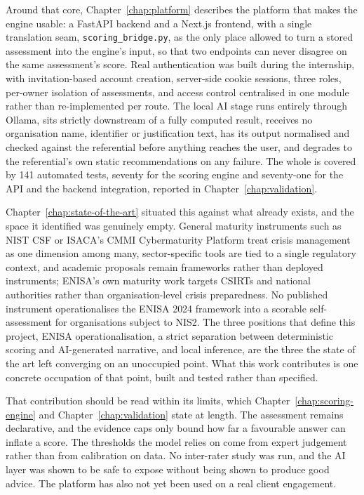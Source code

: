 Around that core, Chapter~\ref{chap:platform} describes the platform that makes
the engine usable: a FastAPI backend and a Next.js frontend, with a single
translation seam, \texttt{scoring\_\allowbreak bridge.\allowbreak py}, as the
only place allowed to turn a stored assessment into the engine's input, so that
two endpoints can never disagree on the same assessment's score. Real
authentication was built during the internship, with invitation-based account
creation, server-side cookie sessions, three roles, per-owner isolation of
assessments, and access control centralised in one module rather than
re-implemented per route. The local AI stage runs entirely through Ollama, sits
strictly downstream of a fully computed result, receives no organisation name,
identifier or justification text, has its output normalised and checked against
the referential before anything reaches the user, and degrades to the
referential's own static recommendations on any failure. The whole is covered
by 141 automated tests, seventy for the scoring engine and seventy-one for the
API and the backend integration, reported in Chapter~\ref{chap:validation}.

Chapter~\ref{chap:state-of-the-art} situated this against what already exists,
and the space it identified was genuinely empty. General maturity instruments
such as NIST CSF or ISACA's CMMI Cybermaturity Platform treat crisis management
as one dimension among many, sector-specific tools are tied to a single
regulatory context, and academic proposals remain frameworks rather than
deployed instruments; ENISA's own maturity work targets CSIRTs and national
authorities rather than organisation-level crisis preparedness. No published
instrument operationalises the ENISA 2024 framework into a scorable
self-assessment for organisations subject to NIS2. The three positions that
define this project, ENISA operationalisation, a strict separation between
deterministic scoring and AI-generated narrative, and local inference, are the
three the state of the art left converging on an unoccupied point. What this
work contributes is one concrete occupation of that point, built and tested
rather than specified.

That contribution should be read within its limits, which
Chapter~\ref{chap:scoring-engine} and Chapter~\ref{chap:validation} state at
length. The assessment remains declarative, and the evidence caps only bound
how far a favourable answer can inflate a score. The thresholds the model
relies on come from expert judgement rather than from calibration on data. No
inter-rater study was run, and the AI layer was shown to be safe to expose
without being shown to produce good advice. The platform has also not yet been
used on a real client engagement.

